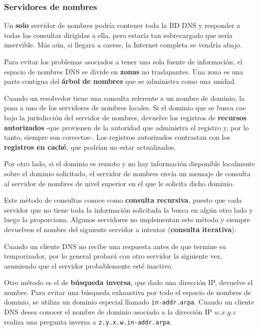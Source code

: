 \documentclass[10pt,a4paper]{article}
\begin{document}
\subsubsection{Servidores de nombres}

Un \textbf{solo} servidor de nombres podría contener toda la BD DNS y responder a todas las consultas dirigidas a ella, pero estaría tan sobrecargado que sería inservible. Más aún, si llegara a caerse, la Internet completa se vendría abajo.

Para evitar los problemas asociados a tener una sola fuente de información, el espacio de nombres DNS se divide en \textbf{zonas} no traslapantes. Una zona es una parte contigua del \textbf{árbol de nombres} que se administra como una unidad.

Cuando un resolvedor tiene una consulta referente a un nombre de dominio, la pasa a uno de los servidores de nombres locales. Si el dominio que se busca cae bajo la jurisdicción del servidor de nombres, devuelve los registros de \textbf{recursos autorizados} -que provienen de la autoridad que administra el registro y, por lo tanto, siempre son correctos-. Los registros autorizados contrastan con los \textbf{registros en caché}, que podrían no estar actualizados.

Por otro lado, si el dominio es remoto y no hay información disponible localmente sobre el dominio solicitado, el servidor de nombres envía un mensaje de consulta al servidor de nombres de nivel superior en el que le solicita dicho dominio.

Este método de consultas conoce como \textbf{consulta recursiva}, puesto que cada servidor que no tiene toda la información solicitada la busca en algún otro lado y luego la proporciona. Algunos servidores no implementan este método y siempre devuelven el nombre del siguiente servidor a intentar (\textbf{consulta iterativa}).

Cuando un cliente DNS no recibe una respuesta antes de que termine su temporizador, por lo general probará con otro servidor la siguiente vez, asumiendo que el servidor probablemente esté inactivo.

Otro método es el de \textbf{búsqueda inversa}, que dado una dirección IP, devuelve el nombre. Para evitar una búsqueda exhaustiva por todo el espacio de nombres de dominio, se utiliza un dominio especial llamado \texttt{in-addr.arpa}. Cuando un cliente DNS desea conocer el nombre de dominio asociado a la dirección IP $w.x.y.z$ realiza una pregunta inversa a \texttt{z.y.x.w.in-addr.arpa}.
\end{document}
